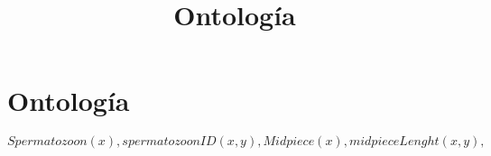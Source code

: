 \documentclass{article}
\title{Ontología}
\begin{document}
\maketitle


\begin{abstract}

\end{abstract}

\section{Ontología}
$$Spermatozoon(x), spermatozoonID(x,y), Midpiece(x), midpieceLenght(x,y), $$
\end{document}
